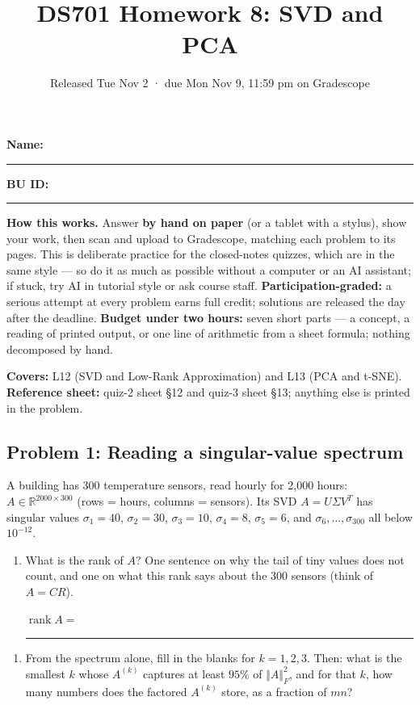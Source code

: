 \documentclass[
  11pt,
]{article}
\title{DS701 Homework 8: SVD and PCA}
\subtitle{Released Tue Nov 2 · due Mon Nov 9, 11:59 pm on Gradescope}
\author{}
\date{}
\providecommand{\tightlist}{%
  \setlength{\itemsep}{0pt}\setlength{\parskip}{0pt}}
\newcommand{\answerspace}[1]{\par\vspace*{#1}}  %
\newcommand{\blank}[1][1.2in]{\rule{#1}{0.4pt}}
\begin{document}
\maketitle


\noindent\textbf{Name:}\ \rule{2.0in}{0.4pt}\qquad\textbf{BU ID:}\ \rule{1.2in}{0.4pt}
\vspace{6pt}

\textbf{How this works.} Answer \textbf{by hand on paper} (or a tablet
with a stylus), show your work, then scan and upload to Gradescope,
matching each problem to its pages. This is deliberate practice for the
closed-notes quizzes, which are in the same style --- so do it as much
as possible without a computer or an AI assistant; if stuck, try AI in
tutorial style or ask course staff. \textbf{Participation-graded:} a
serious attempt at every problem earns full credit; solutions are
released the day after the deadline. \textbf{Budget under two hours:}
seven short parts --- a concept, a reading of printed output, or one
line of arithmetic from a sheet formula; nothing decomposed by hand.

\textbf{Covers:} L12 (SVD and Low-Rank Approximation) and L13 (PCA and
t-SNE). \textbf{Reference sheet:} quiz-2 sheet §12 and quiz-3 sheet §13;
anything else is printed in the problem.

\subsection{Problem 1: Reading a singular-value
spectrum}\label{problem-1-reading-a-singular-value-spectrum}

A building has 300 temperature sensors, read hourly for 2,000 hours:
\(A \in \mathbb R^{2000\times300}\) (rows = hours, columns = sensors).
Its SVD \(A = U\Sigma V^T\) has singular values \(\sigma_1 = 40\),
\(\sigma_2 = 30\), \(\sigma_3 = 10\), \(\sigma_4 = 8\),
\(\sigma_5 = 6\), and \(\sigma_6,\ldots,\sigma_{300}\) all below
\(10^{-12}\).

\begin{enumerate}
\def\labelenumi{(\alph{enumi})}
\item
  What is the rank of \(A\)? One sentence on why the tail of tiny values
  does not count, and one on what this rank says about the 300 sensors
  (think of \(A = CR\)).

  \(\operatorname{rank} A =\) \blank[0.8in]
\end{enumerate}

\answerspace{0.4in}

\begin{enumerate}
\def\labelenumi{(\alph{enumi})}
\setcounter{enumi}{1}
\tightlist
\item
  From the spectrum alone, fill in the blanks for \(k = 1, 2, 3\). Then:
  what is the smallest \(k\) whose \(A^{(k)}\) captures at least
  \(95\%\) of \(\Vert A\Vert_F^2\), and for that \(k\), how many numbers
  does the factored \(A^{(k)}\) store, as a fraction of \(mn\)?
\end{enumerate}
\end{document}
